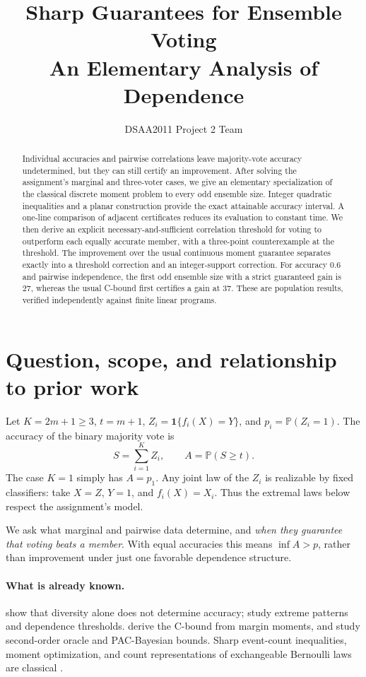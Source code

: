 \documentclass{article}
\title{Sharp Guarantees for Ensemble Voting\\
An Elementary Analysis of Dependence}
\author{DSAA2011 Project 2 Team}
\newcommand{\Prb}{\mathbb P}
\newcommand{\ind}{\mathbf 1}
\begin{document}
\maketitle
\begin{abstract}
Individual accuracies and pairwise correlations leave majority-vote accuracy undetermined, but they can still certify an improvement. After solving the assignment's marginal and three-voter cases, we give an elementary specialization of the classical discrete moment problem to every odd ensemble size. Integer quadratic inequalities and a planar construction provide the exact attainable accuracy interval. A one-line comparison of adjacent certificates reduces its evaluation to constant time. We then derive an explicit necessary-and-sufficient correlation threshold for voting to outperform each equally accurate member, with a three-point counterexample at the threshold. The improvement over the usual continuous moment guarantee separates exactly into a threshold correction and an integer-support correction. For accuracy $0.6$ and pairwise independence, the first odd ensemble size with a strict guaranteed gain is $27$, whereas the usual C-bound first certifies a gain at $37$. These are population results, verified independently against finite linear programs.
\end{abstract}

\section{Question, scope, and relationship to prior work}
Let $K=2m+1\ge3$, $t=m+1$, $Z_i=\ind\{f_i(X)=Y\}$, and $p_i=\Prb(Z_i=1)$. The accuracy of the binary majority vote is
\begin{equation}\label{eq:accuracy}
 S=\sum_{i=1}^K Z_i,\qquad A=\Prb(S\ge t).
\end{equation}
The case $K=1$ simply has $A=p_1$. Any joint law of the $Z_i$ is realizable by fixed classifiers: take $X=Z$, $Y=1$, and $f_i(X)=X_i$. Thus the extremal laws below respect the assignment's model.

We ask what marginal and pairwise data determine, and \emph{when they guarantee that voting beats a member}. With equal accuracies this means $\inf A>p$, rather than improvement under just one favorable dependence structure.

\paragraph{What is already known.}
\citet{kuncheva2003} show that diversity alone does not determine accuracy; \citet{kunchevalimits2003} study extreme patterns and dependence thresholds. \citet{germain2015} derive the C-bound from margin moments, and \citet{masegosa2020} study second-order oracle and PAC-Bayesian bounds. Sharp event-count inequalities, moment optimization, and count representations of exchangeable Bernoulli laws are classical \citep{boros1989,bertsimas2005,fontana2021}.
\end{document}
